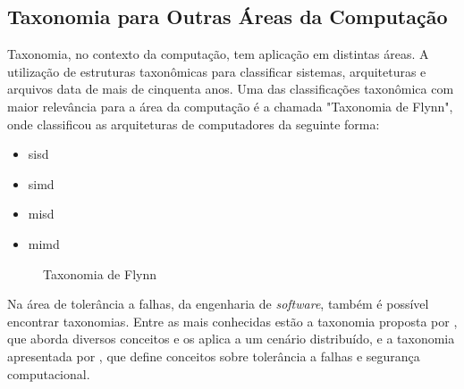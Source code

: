 \subsection{Taxonomia para Outras Áreas da Computação}
\label{subsec:taxonomia other computer areas}
Taxonomia, no contexto da computação, tem aplicação em distintas áreas. A utilização de estruturas taxonômicas para classificar sistemas, arquiteturas e arquivos data de mais de
cinquenta anos. Uma das classificações taxonômica com maior relevância para a área da computação é a chamada "Taxonomia de Flynn",
onde  classificou as arquiteturas de computadores da seguinte forma:\\

\begin{minipage}{.66\textwidth}
    \begin{singlespace}
        \begin{itemize}
            \item \acrfull{sisd}
            \item \acrfull{simd}
            \item \acrfull{misd}
            \item \acrfull{mimd}
        \end{itemize}
    \end{singlespace}
\end{minipage}
\vspace{0.5cm}

\begin{figure}[!ht]
    \caption{Taxonomia de Flynn}
    \label{fig:taxonomiaFlynn}  
\end{figure}

\vspace{0.5cm}
\par
Na área de tolerância a falhas, da engenharia de \textit{software}, também é possível encontrar taxonomias. Entre as mais conhecidas estão a taxonomia proposta por , que aborda diversos conceitos e os aplica a um cenário distribuído,
e a taxonomia apresentada por , que define conceitos sobre tolerância a falhas e segurança computacional.

